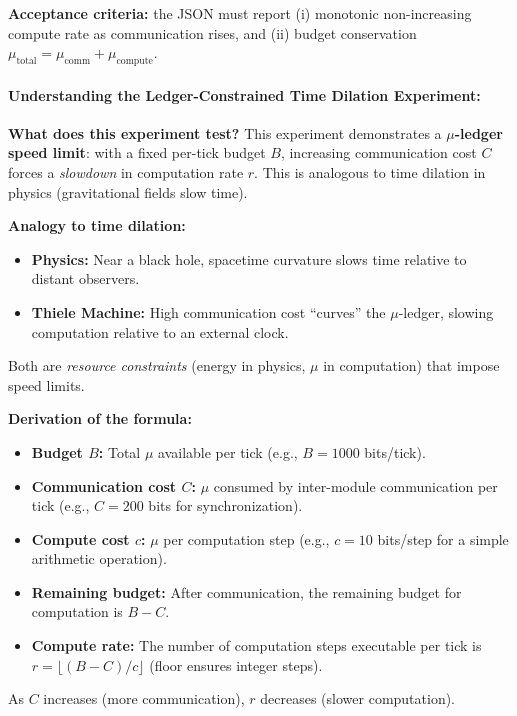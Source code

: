 \textbf{Acceptance criteria:} the JSON must report (i) monotonic non-increasing compute rate as communication rises, and (ii) budget conservation $\mu_{\text{total}}=\mu_{\text{comm}}+\mu_{\text{compute}}$.

\paragraph{Understanding the Ledger-Constrained Time Dilation Experiment:}

\textbf{What does this experiment test?} This experiment demonstrates a \textbf{$\mu$-ledger speed limit}: with a fixed per-tick budget $B$, increasing communication cost $C$ forces a \textit{slowdown} in computation rate $r$. This is analogous to time dilation in physics (gravitational fields slow time).

\textbf{Analogy to time dilation:}
\begin{itemize}
    \item \textbf{Physics:} Near a black hole, spacetime curvature slows time relative to distant observers.
    \item \textbf{Thiele Machine:} High communication cost ``curves'' the $\mu$-ledger, slowing computation relative to an external clock.
\end{itemize}
Both are \textit{resource constraints} (energy in physics, $\mu$ in computation) that impose speed limits.

\textbf{Derivation of the formula:}
\begin{itemize}
    \item \textbf{Budget $B$:} Total $\mu$ available per tick (e.g., $B = 1000$ bits/tick).
    
    \item \textbf{Communication cost $C$:} $\mu$ consumed by inter-module communication per tick (e.g., $C = 200$ bits for synchronization).
    
    \item \textbf{Compute cost $c$:} $\mu$ per computation step (e.g., $c = 10$ bits/step for a simple arithmetic operation).
    
    \item \textbf{Remaining budget:} After communication, the remaining budget for computation is $B - C$.
    
    \item \textbf{Compute rate:} The number of computation steps executable per tick is $r = \lfloor (B - C) / c \rfloor$ (floor ensures integer steps).
\end{itemize}
As $C$ increases (more communication), $r$ decreases (slower computation).

